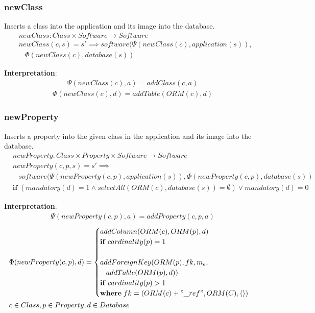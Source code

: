 \documentclass[10pt]{article}
\begin{document}
\subsubsection{newClass}
Inserts a class into the application and its image into the database.
\begin{align}
& newClass: Class \times Software \rightarrow Software \\
& newClass(c, s) = s' \implies software(\Psi(newClass(c), application(s)), \nonumber \\
& \;\;\; \Phi(newClass(c), database(s))
\end{align}

\noindent \textbf{Interpretation}:
\begin{align}
\Psi(newClass(c), a) = addClass(c, a)
\end{align}
\begin{align}
\Phi(newClass(c), d) = addTable(ORM(c),  d)
\end{align}


\subsubsection{newProperty}
Inserts a property into the given class in the application and its image into the database.
\begin{align}
& newProperty: Class \times Property \times Software \rightarrow Software \\
& newProperty(c, p, s) = s' \implies \nonumber \\ 
& \;\;\; software(\Psi(newProperty(c, p), application(s)), \Phi(newProperty(c,p), database(s)) \\
& \mathbf{if}\; (mandatory(d) = 1 \land selectAll(ORM(c), database(s)) = \emptyset ) \lor mandatory(d) = 0
\end{align}

\noindent \textbf{Interpretation}:
\begin{align}
\Psi(newProperty(c, p), a) = addProperty(c, p, a)
\end{align}
\begin{align}
&\Phi(newProperty(c, p), d) = \begin{cases}
  addColumn(ORM(c), ORM(p),  d) \\ \mathbf{if} \; cardinality(p) = 1  \\\\ 
  addForeignKey(ORM(p), fk , m_e,  \\
  \;\;\; addTable(ORM(p),  d)) \\
  \mathbf{if} \; cardinality(p) > 1  \\
  \mathbf{where} \; fk = (ORM(c) + "\_ref", ORM(C), \langle \rangle)
   \end{cases}\\
& c \in Class, p \in Property, d \in Database   \nonumber
\end{align}
\end{document}
